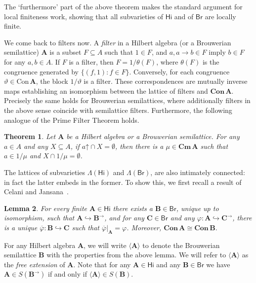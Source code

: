 \documentclass{amsart}
\newtheorem{theorem}{Theorem}[section]
\newtheorem{lemma}[theorem]{Lemma}
\newcommand{\alg}[1]{\mathbf{#1}}
\newcommand{\var}[1]{\mathsf{#1}}
\newcommand{\Con}[1]{\mathbf{Con}\, #1}
\newcommand{\con}[1]{\mathrm{Con}\, #1}
\newcommand{\Cm}[1]{\mathbf{Cm}\, #1}
\def\ra{\rightarrow}
\def\up#1{{#1}\mathord{\uparrow}}
\begin{document}
The `furthermore' part of the above theorem makes the  
standard argument for local finiteness work, showing that all subvarieties
of $\var{Hi}$ and of $\var{Br}$ are locally finite. 

We come back to filters now. A \emph{filter} in a Hilbert algebra (or
a Brouwerian semilattice) $\alg{A}$ is a subset $F\subseteq A$ such that
$1\in F$,  and $a,a\ra b\in F$ imply $b\in F$ for any $a,b\in A$.
If $F$ is a filter, then $F = 1/\theta(F)$, where
$\theta(F)$ is the congruence generated by $\{(f,1): f\in F\}$. Conversely,
for each congruence $\vartheta\in\con{\alg{A}}$, the block
$1/\vartheta$ is a filter. These correspondences are mutually inverse maps
establishing an 
isomorphism between the lattice of filters and $\Con{\alg{A}}$. Precisely the
same holds for Brouwerian semilattices, where additionally filters in the above
sense coincide with semilattice filters. Furthermore, the following analogue of
the Prime Filter Theorem holds.

\begin{theorem}\label{thm:PrimeFilter}
Let $\alg{A}$ be a Hilbert algebra or a Brouwerian semilattice.
For any $a\in A$ and any $X\subseteq A$, if $\up{a}\cap X = \emptyset$, then
there is a $\mu\in\Cm{\alg{A}}$ such that $a\in 1/\mu$ and
$X\cap 1/\mu = \emptyset$.
\end{theorem}  

The lattices of subvarieties $\Lambda(\var{Hi})$ and $\Lambda(\var{Br})$,
are also intimately connected: in fact the latter embeds in the former.
To show this, we first recall a result of
Celani and Jansana~\cite[Thms.~6.7, 6.8, Prop.~7.2]{CJ12}. 

\begin{lemma}\label{lem:min-ext}
For every finite $\alg{A}\in\var{Hi}$ there exists a 
$\alg{B}\in\var{Br}$, unique up to isomorphism,
such that $\alg{A}\hookrightarrow \alg{B}^\ra$, and
for any $\alg{C}\in\var{Br}$ and any
$\varphi\colon \alg{A}\hookrightarrow \alg{C}^\ra$, there is a unique
$\overline{\varphi}\colon \alg{B}\hookrightarrow \alg{C}$ such that
$\overline{\varphi}|_{\alg{A}} = \varphi$.
Moreover, $\Con{\alg{A}} \cong \Con{\alg{B}}$. 
\end{lemma}  


For any Hilbert algebra $\alg{A}$, we will write $\langle \alg{A}\rangle$
to denote the Brouwerian semilattice $\alg{B}$ with the properties from the
above lemma. We will refer to $\langle \alg{A}\rangle$
as the \emph{free extension} of $\alg{A}$. Note that for any
$\alg{A}\in\var{Hi}$ and any $\alg{B}\in\var{Br}$ we have
$\alg{A}\in S(\alg{B}^\ra)$ if and only if
$\langle \alg{A}\rangle\in S(\alg{B})$.
\end{document}
